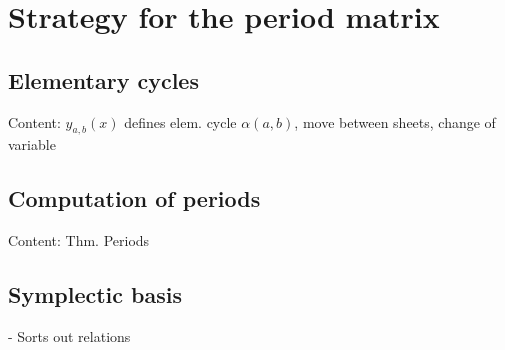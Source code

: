 \documentclass[main.tex]{subfiles}
\begin{document}
  \section{Strategy for the period matrix}

   \subsection{Elementary cycles}
    Content: $y_{a,b}(x)$ defines elem. cycle $\alpha(a,b)$, move between sheets, change of variable
  
  \subsection{Computation of periods}
    Content: Thm. Periods
  
  \subsection{Symplectic basis}
    - Sorts out relations
  
\end{document}
